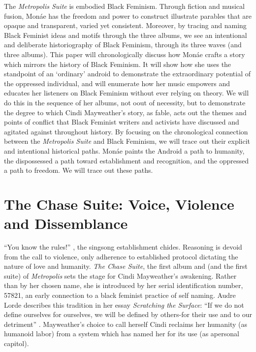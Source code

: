 \documentclass[a4paper, 11pt]{article} %
\begin{document}
The \emph{Metropolis Suite} is embodied Black Feminism.
Through fiction and musical fusion, Mon\'ae has the freedom and power to construct illustrate parables that are opaque and transparent, varied yet consistent.
Moreover, by tracing and naming Black Feminist ideas and motifs through the three albums, we see an intentional and deliberate historiography of Black Feminism, through its three waves (and three albums).
This paper will chronologically discuss how Mon\'ae crafts a story which mirrors the history of Black Feminism.
It will show how she uses the standpoint of an `ordinary' android to demonstrate the extraordinary potential of the oppressed individual, and will enumerate how her music empowers and educates her listeners on Black Feminism without ever relying on theory.
We will do this in the sequence of her albums, not oout of necessity, but to demonstrate the degree to which Cindi Mayweather's story, as fable, acts out the themes and points of conflict that Black Feminist writers and activists have discussed and agitated against throughout history.
By focusing on the chronological connection between the \emph{Metropolis Suite} and Black Feminism, we will trace out their explicit and intentional historical paths.  
Mon\'ae paints the Android a path to humanity, the dispossessed a path toward establishment and recognition, and the oppressed a path to freedom.
We will trace out these paths. 


\section*{The Chase Suite: Voice, Violence and Dissemblance}

``You know the rules!'' \cite{wolfmasters}, the singsong establishment chides.
Reasoning is devoid from the call to violence, only adherence to established protocol dictating the nature of love and humanity.
\emph{The Chase Suite}, the first album and (and the first suite) of \emph{Metropolis} sets the stage for Cindi Mayweather's awakening.
Rather than by her chosen name, she is introduced by her serial identification number, 57821, an early connection to a black feminist practice of self naming. 
Audre Lorde describes this tradition in her essay \emph{Scratching the Surface}: ``If we do not define ourselves for ourselves, we will be defined by others-for their use and to our detriment'' \cite{lordescratching}.
Mayweather's choice to call herself Cindi reclaims her humanity (as humanoid labor) from a system which has named her for its use (as apersonal capitol).
\end{document}
